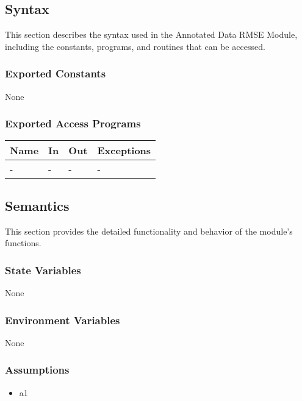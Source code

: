 \documentclass[12pt, titlepage]{article}
\begin{document}
\subsection{Syntax}

This section describes the syntax used in the Annotated Data RMSE Module,
including the constants, programs, and routines that can be accessed.

\subsubsection{Exported Constants}

None

\subsubsection{Exported Access Programs}

\begin{center}
\begin{tabular}{p{2cm} p{4cm} p{4cm} p{2cm}}
\hline
\textbf{Name} & \textbf{In} & \textbf{Out} & \textbf{Exceptions} \\
\hline
- & - & - & - \\
\hline
\end{tabular}
\end{center}

\subsection{Semantics}

This section provides the detailed functionality and behavior of the module’s
functions.

\subsubsection{State Variables}

None

\subsubsection{Environment Variables}

None

\subsubsection{Assumptions}

\begin{itemize}
\item a1
\end{itemize}
\end{document}
